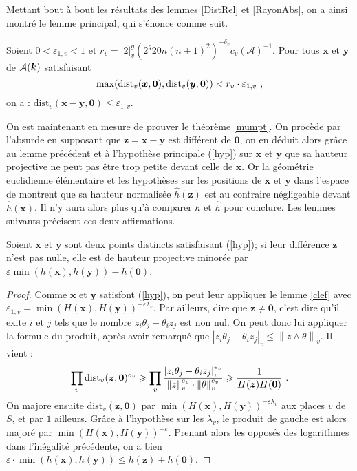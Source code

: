 \documentclass[11pt, twoside, a4paper, french]{article}
\numberwithin{equation}{section}
\renewcommand{\ge}{\geqslant} \renewcommand{\le}{\leqslant}
\newcommand{\eps}{\varepsilon} \newcommand{\truc}{\,\cdot\,}
\newcommand{\av}[2][v]{\left\lvert#2\right\rvert_{#1}} 		%
\newcommand{\nv}[2][v]{\left\lVert#2\right\rVert_{#1}} 		%
\newcommand{\dv}{{\delta_v}} 					%
\newcommand{\Dv}{\mathrm{dist}_v} 				%
\newcommand{\A}{\mathcal{A}} 					%
\newcommand{\p}[1]{{\boldsymbol{#1}}} 				%
\newcommand{\OA}{\p{0}} 					%
\newcommand{\coa}{\theta} 					%
\newcommand{\hn}{\hat{h}} 					%
\begin{document}
Mettant bout à bout les résultats des lemmes \ref{DistRel} et \ref{RayonAbs}, on a ainsi montré le lemme principal, qui s'énonce comme suit.

\begin{lem} \label{clef}
Soient $0 < \eps_{1,v} < 1$ et $r_v = \av 2^g (2^g20n(n+1)^2)^{-\dv}c_v(\A)^{-1}$. Pour tous $\p x$ et $\p y$ de $\A(\cdn)$ satisfaisant 
\[ \max ( \Dv(\p{x}, \OA), \Dv(\p{y}, \OA) ) < r_v \cdot \eps_{1,v} \pmm{,} \]
on a : $\Dv(\p{x}-\p{y}, \OA) \le \eps_{1,v}$.
\end{lem}

On est maintenant en mesure de prouver le théorème \ref{mumpt}. On procède par l'absurde en supposant que $\p{z} = \p{x} - \p{y}$ est différent de $\OA$, on en déduit alors grâce au lemme précédent et à l'hypothèse principale (\ref{hyp}) sur $\p{x}$ et $\p{y}$ que sa hauteur projective ne peut pas être trop petite devant celle de $\p{x}$. Or la géométrie euclidienne élémentaire et les hypothèses sur les positions de $\p{x}$ et $\p{y}$ dans l'espace de  montrent que sa hauteur normalisée $\hn(\p{z})$ est au contraire négligeable devant $\hn(\p{x})$. Il n'y aura alors plus qu'à comparer $h$ et $\hn$ pour conclure. Les lemmes suivants précisent ces deux affirmations.

\begin{lem} \label{papti}
Soient $\p{x}$ et $\p{y}$ sont deux points distincts satisfaisant (\ref{hyp}); si leur différence $\p{z}$ n'est pas nulle, elle est de hauteur projective minorée par $\eps \min(h(\p{x}), h(\p{y})) - h(\OA)$.
\end{lem}

\begin{proof}
Comme $\p{x}$ et $\p{y}$ satisfont (\ref{hyp}), on peut leur appliquer le lemme \ref{clef} avec $\eps_{1, v} = \min(H(\p{x}), H(\p{y}))^{-\eps\lambda_v}$. Par ailleurs, dire que $\p{z} \neq \OA$, c'est dire qu'il exite $i$ et $j$ tels que le nombre $z_i \coa_j - \coa_i z_j$ est non nul. On peut donc lui appliquer la formule du produit, après avoir remarqué que $\av{z_i \coa_j - \coa_i z_j} \le \nv{z\wedge \coa}$. Il vient :
\[ \prod_v \Dv(\p{z}, \OA)^{e_v} \ge \prod_v \frac{\av{z_i \coa_j - \coa_i z_j}^{e_v}}{\nv{z}^{e_v}\cdot\nv{\coa}^{e_v}}
  \ge \frac{1}{H(\p{z}) H(\OA)} \pmm{.} \]
On majore ensuite $\Dv(\p{z}, \OA)$ par $\min(H(\p{x}), H(\p{y}))^{-\eps\lambda_v}$ aux places $v$ de $S$, et par $1$ ailleurs. Grâce à l'hypothèse sur les $\lambda_v$, le produit de gauche est alors majoré par $\min(H(\p{x}), H(\p{y}))^{-\eps}$. Prenant alors les opposés des logarithmes dans l'inégalité précédente, on a bien $\eps \cdot \min(h(\p{x}), h(\p{y})) \le h(\p{z}) + h(\OA)$.
\end{proof}
\end{document}
